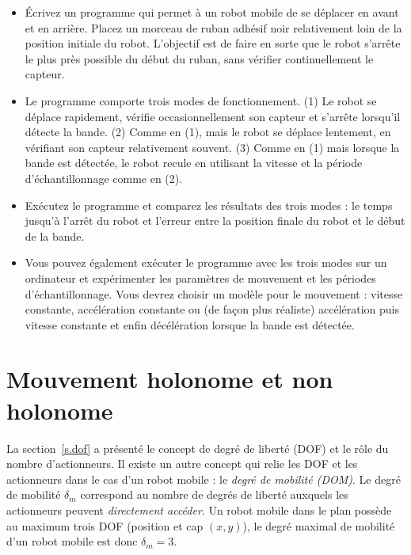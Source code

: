 \begin{framed}
\begin{itemize}
\item Écrivez un programme qui permet à un robot mobile de se déplacer en avant et en arrière. Placez un morceau de ruban adhésif noir relativement loin de la position initiale du robot. L'objectif est de faire en sorte que le robot s'arrête le plus près possible du début du ruban, sans vérifier continuellement le capteur. 
\item Le programme comporte trois modes de fonctionnement. (1) Le robot se déplace rapidement, vérifie occasionnellement son capteur et s'arrête lorsqu'il détecte la bande. (2) Comme en (1), mais le robot se déplace lentement, en vérifiant son capteur relativement souvent. (3) Comme en (1) mais lorsque la bande est détectée, le robot recule en utilisant la vitesse et la période d'échantillonnage comme en (2).
\item Exécutez le programme et comparez les résultats des trois modes : le temps jusqu'à l'arrêt du robot et l'erreur entre la position finale du robot et le début de la bande.
\item Vous pouvez également exécuter le programme avec les trois modes sur un ordinateur et expérimenter les paramètres de mouvement et les périodes d'échantillonnage. Vous devrez choisir un modèle pour le mouvement : vitesse constante, accélération constante ou (de façon plus réaliste) accélération puis vitesse constante et enfin décélération lorsque la bande est détectée.
\end{itemize}
\end{framed}

\section{Mouvement holonome et non holonome}\label{s.holonomic}

La section~\ref{s.dof} a présenté le concept de degré de liberté (DOF) et le rôle du nombre d'actionneurs. Il existe un autre concept qui relie les DOF et les actionneurs dans le cas d'un robot mobile : le \emph{degré de mobilité (DOM)}. Le degré de mobilité $\delta_m$ correspond au nombre de degrés de liberté auxquels les actionneurs peuvent \emph{directement accéder}. Un robot mobile dans le plan possède au maximum trois DOF (position et cap $(x,y)$), le degré maximal de mobilité d'un robot mobile est donc $\delta_m = 3$.

